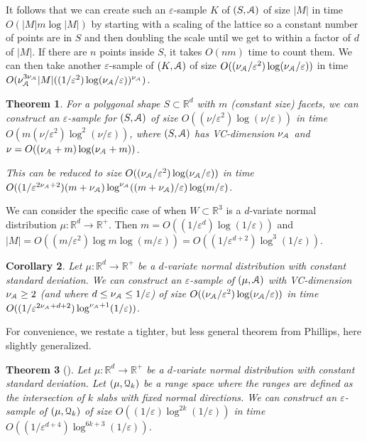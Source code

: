 \documentclass{journal}
\newcommand{\eps}{\varepsilon}
\newcommand{\Eu}[1]{\ensuremath{\EuScript{#1}}}
\newcommand{\R}{\ensuremath{\mathbb{R}}}
\newtheorem {theorem}{Theorem}[section]
\newtheorem {corollary}[theorem]{Corollary}
\begin{document}
It follows that we can create such an $\eps$-sample $K$ of $(S, \Eu A)$ of size $|M|$ in time $O(|M| m \log |M|)$ by starting with a scaling of the lattice so a constant number of points are in $S$ and then doubling the scale until we get to within a factor of $d$ of $|M|$.  If there are $n$ points inside $S$, it takes $O(nm)$ time to count them.  We can then take another $\eps$-sample of $(K, \Eu A)$ of size
$O((\nu_{\Eu A}/\eps^2) \log (\nu_{\Eu A} /\eps))$
 in time
 $O(\nu_{\Eu A}^{3 \nu_{\Eu A}} |M| ((1/\eps^2) \log (\nu_{\Eu A} / \eps))^{\nu_{\Eu A}})$.

\begin{theorem}
For a polygonal shape $S \subset \R^d$ with $m$ (constant size) facets, we can construct an $\eps$-sample for $(S, \Eu{A})$ of size
$O((\nu/\eps^2) \log (\nu/\eps))$
in time
$O(m (\nu/\eps^2) \log^2 (\nu/\eps))$,
where $(S, \Eu{A})$ has VC-dimension $\nu_{\Eu A}$ and
$\nu = O((\nu_{\Eu{A}}+m) \log (\nu_{\Eu{A}}+m))$.

This can be reduced to size
$O((\nu_{\Eu A}/\eps^2) \log (\nu_{\Eu A}/\eps))$
in time
$O((1/\eps^{2\nu_{\Eu A} + 2}) (m+\nu_{\Eu A}) \log^{\nu_{\Eu A}}((m + \nu_{\Eu A})/\eps) \log (m/\eps)$.
\label{lem:mu-eps}
\end{theorem}

We can consider the specific case of when $W \subset \R^3$ is a $d$-variate normal distribution $\mu : \R^d \to \R^+$.  Then $m = O((1/\eps^d) \log (1/\eps))$ and $|M| = O((m/\eps^2) \log m \log (m/\eps)) = O((1/\eps^{d+2}) \log^3 (1/\eps))$.

\begin{corollary}
Let $\mu : \R^d \to \R^+$ be a $d$-variate normal distribution with constant standard deviation.
We can construct an $\eps$-sample of $(\mu, \Eu A)$ with VC-dimension $\nu_{\Eu A} \geq 2$ (and where $d \leq \nu_{\Eu A} \leq 1/\eps$) of size $O((\nu_{\Eu A} / \eps^2) \log (\nu_{\Eu A}/\eps))$ in time
$O((1/\eps^{2\nu_{\Eu A} + d + 2}) \log^{\nu_{\Eu A}+1} (1/\eps))$.
\label{cor:norm-es}
\end{corollary}

For convenience, we restate a tighter, but less general theorem from Phillips, here slightly generalized.
\begin{theorem}[\cite{Phi08,Phi09}]
Let $\mu : \R^d \to \R^+$ be a $d$-variate normal distribution with constant standard deviation.
Let $(\mu, \Eu Q_k)$ be a range space where the ranges are defined as the intersection of $k$ slabs with fixed normal directions.
We can construct an $\eps$-sample of $(\mu, \Eu Q_k)$ of size $O((1/\eps)\log^{2k} (1/\eps))$ in time $O((1/\eps^{d+4}) \log^{6k + 3} (1/\eps))$.
\label{thm:Phi08}
\end{theorem}
\end{document}
